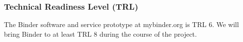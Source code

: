   
  
  




  \subsubsection{Technical Readiness Level (TRL)}

  The Binder software and service prototype at mybinder.org is TRL 6. We will
  bring Binder to at least TRL 8 during the course of the project.


